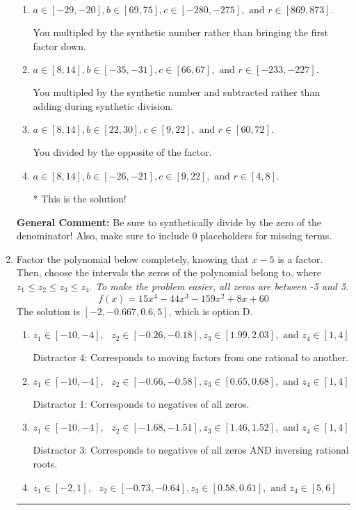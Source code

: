 \documentclass{extbook}[14pt]
\newcommand{\litem}[1]{\item #1

\rule{\textwidth}{0.4pt}}
\begin{document}
\begin{enumerate}
{\begin{enumerate}[label=\Alph*.]
 You divided by the opposite of the factor AND multipled the first factor rather than just bringing it down.
\item \( a \in [-29, -20], b \in [69, 75], c \in [-280, -275], \text{ and } r \in [869, 873]. \)

 You multipled by the synthetic number rather than bringing the first factor down.
\item \( a \in [8, 14], b \in [-35, -31], c \in [66, 67], \text{ and } r \in [-233, -227]. \)

 You multipled by the synthetic number and subtracted rather than adding during synthetic division.
\item \( a \in [8, 14], b \in [22, 30], c \in [9, 22], \text{ and } r \in [60, 72]. \)

 You divided by the opposite of the factor.
\item \( a \in [8, 14], b \in [-26, -21], c \in [9, 22], \text{ and } r \in [4, 8]. \)

* This is the solution!
\end{enumerate}

\textbf{General Comment:} Be sure to synthetically divide by the zero of the denominator! Also, make sure to include 0 placeholders for missing terms.
}
\litem{
Factor the polynomial below completely, knowing that $x -5$ is a factor. Then, choose the intervals the zeros of the polynomial belong to, where $z_1 \leq z_2 \leq z_3 \leq z_4$. \textit{To make the problem easier, all zeros are between -5 and 5.}
\[ f(x) = 15x^{4} -44 x^{3} -159 x^{2} +8 x + 60 \]The solution is \( [-2, -0.667, 0.6, 5] \), which is option D.\begin{enumerate}[label=\Alph*.]
\item \( z_1 \in [-10, -4], \text{   }  z_2 \in [-0.26, -0.18], z_3 \in [1.99, 2.03], \text{   and   } z_4 \in [1, 4] \)

 Distractor 4: Corresponds to moving factors from one rational to another.
\item \( z_1 \in [-10, -4], \text{   }  z_2 \in [-0.66, -0.58], z_3 \in [0.65, 0.68], \text{   and   } z_4 \in [1, 4] \)

 Distractor 1: Corresponds to negatives of all zeros.
\item \( z_1 \in [-10, -4], \text{   }  z_2 \in [-1.68, -1.51], z_3 \in [1.46, 1.52], \text{   and   } z_4 \in [1, 4] \)

 Distractor 3: Corresponds to negatives of all zeros AND inversing rational roots.
\item \( z_1 \in [-2, 1], \text{   }  z_2 \in [-0.73, -0.64], z_3 \in [0.58, 0.61], \text{   and   } z_4 \in [5, 6] \)


\end{enumerate}}
\end{enumerate}
\end{document}
